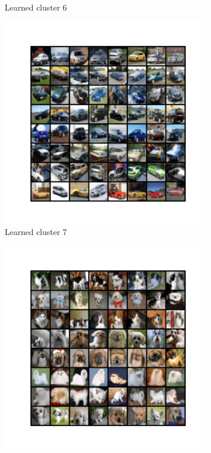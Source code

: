 \documentclass[10pt,twocolumn,letterpaper]{article}
\begin{document}
\begin{figure}
\begin{subfigure}{0.32\textwidth}
       \caption{Learned cluster 6}
       \label{fig:cifar10-6}
     \end{subfigure}
     \hfill
     \begin{subfigure}{0.32\textwidth}
       \includegraphics[width=\linewidth,trim={2cm 2cm 2cm 2cm},clip]{figures/experiments/cifar10_cluster/nearest_class6.png}
       \caption{Learned cluster 7}
       \label{fig:cifar10-7}
     \end{subfigure}
     \hfill
     \begin{subfigure}{0.32\textwidth}
       \includegraphics[width=\linewidth,trim={2cm 2cm 2cm 2cm},clip]{figures/experiments/cifar10_cluster/nearest_class7.png}

\end{subfigure}
\end{figure}
\end{document}
